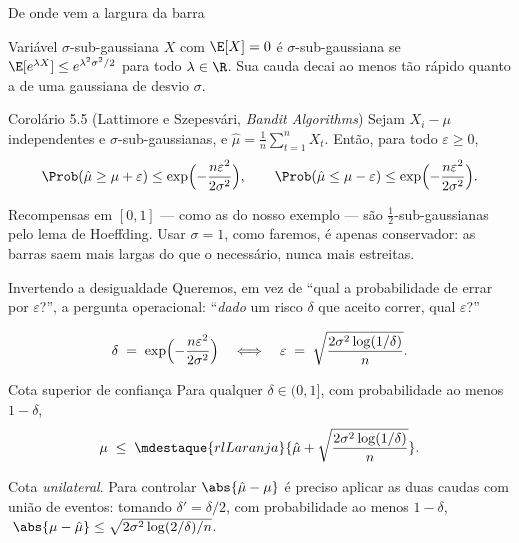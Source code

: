 \documentclass[aspectratio=169, 10pt]{beamer}
\newcommand{\muhat}{\hat{\mu}}
\begin{document}
\begin{frame}{De onde vem a largura da barra}
  \begin{defbox}{Variável $\sigma$-sub-gaussiana}
    $X$ com $\E[X] = 0$ é $\sigma$-sub-gaussiana se
    $\E[e^{\lambda X}] \le e^{\lambda^2\sigma^2/2}$ para todo
    $\lambda \in \R$. Sua cauda decai ao menos tão rápido quanto a de uma
    gaussiana de desvio $\sigma$.
  \end{defbox}

  \begin{teobox}{Corolário 5.5 (Lattimore e Szepesvári, \emph{Bandit Algorithms})}
    Sejam $X_i - \mu$ independentes e $\sigma$-sub-gaussianas, e
    $\muhat = \frac{1}{n}\sum_{t=1}^{n} X_t$. Então, para todo
    $\varepsilon \ge 0$,
    \[
      \Prob(\muhat \ge \mu + \varepsilon) \le \exp\Bigl(-\frac{n\varepsilon^2}{2\sigma^2}\Bigr),
      \qquad
      \Prob(\muhat \le \mu - \varepsilon) \le \exp\Bigl(-\frac{n\varepsilon^2}{2\sigma^2}\Bigr).
    \]
  \end{teobox}

  \begin{ideiabox}
    Recompensas em $[0,1]$ --- como as do nosso exemplo --- são
    $\tfrac12$-sub-gaussianas pelo lema de Hoeffding. Usar $\sigma = 1$,
    como faremos, é apenas conservador: as barras saem mais largas do que
    o necessário, nunca mais estreitas.
  \end{ideiabox}
\end{frame}

\begin{frame}{Invertendo a desigualdade}
  Queremos, em vez de ``qual a probabilidade de errar por
  $\varepsilon$?'', a pergunta operacional: ``\emph{dado} um risco
  $\delta$ que aceito correr, qual $\varepsilon$?''

  \[
    \delta \;=\; \exp\Bigl(-\frac{n\varepsilon^2}{2\sigma^2}\Bigr)
    \quad\Longleftrightarrow\quad
    \varepsilon \;=\; \sqrt{\frac{2\sigma^2 \log(1/\delta)}{n}}.
  \]

  \begin{teobox}{Cota superior de confiança}
    Para qualquer $\delta \in (0,1]$, com probabilidade ao menos
    $1 - \delta$,
    \[
      \mu \;\le\; \mdestaque{rlLaranja}{\muhat + \sqrt{\frac{2\sigma^2\log(1/\delta)}{n}}}.
    \]
  \end{teobox}

  \begin{alertabox}
    Cota \emph{unilateral}. Para controlar $\abs{\muhat - \mu}$ é preciso
    aplicar as duas caudas com união de eventos: tomando
    $\delta' = \delta/2$, com probabilidade ao menos $1 - \delta$,
    $\;\abs{\mu - \muhat} \le \sqrt{2\sigma^2\log(2/\delta)/n}$.
  \end{alertabox}
\end{frame}
\end{document}
